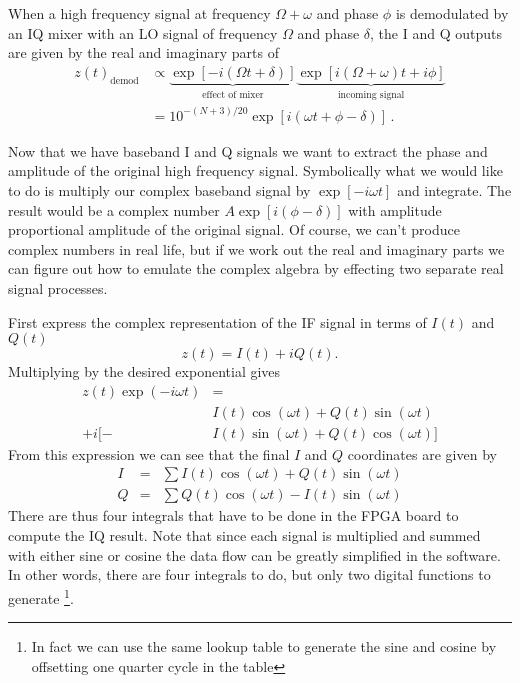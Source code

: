 
When a high frequency signal at frequency $\Omega+\omega$ and phase $\phi$ is demodulated by an IQ mixer with an LO signal of frequency $\Omega$ and phase $\delta$, the I and Q outputs are given by the real and imaginary parts of
\begin{align}
z(t)_{\textrm{demod}} &\propto \underbrace{\exp \left[-i \left( \Omega t + \delta \right) \right]}_{\textrm{effect of mixer}} \underbrace{\exp \left[ i\left( \Omega + \omega \right) t + i \phi \right]}_{\textrm{incoming signal}} \nonumber \\
&= 10^{-(N+3)/20} \exp \left[ i \left( \omega t + \phi-\delta \right) \right] \, . \nonumber
\end{align}


Now that we have baseband I and Q signals we want to extract the phase and amplitude of the original high frequency signal. Symbolically what we would like to do is multiply our complex baseband signal by $\exp \left[ -i \omega t \right]$ and integrate. The result would be a complex number $A \exp \left[ i \left( \phi - \delta \right) \right]$ with amplitude proportional amplitude of the original signal. Of course, we can't produce complex numbers in real life, but if we work out the real and imaginary parts we can figure out how to emulate the complex algebra by effecting two separate real signal processes.

First express the complex representation of the IF signal in terms of $I(t)$ and $Q(t)$ \begin{equation}
z(t) = I(t) + iQ(t). \end{equation}
Multiplying by the desired exponential gives \begin{align}
z(t) \exp \left(-i \omega t \right) &= \nonumber \\
        & I(t) \cos (\omega t) + Q(t) \sin (\omega t) \nonumber \\
+ i [ - & I(t) \sin (\omega t) + Q(t) \cos (\omega t) ] \end{align}
From this expression we can see that the final $I$ and $Q$ coordinates are given by \begin{eqnarray}
I &=& \sum I(t)\cos(\omega t) + Q(t) \sin(\omega t) \\
Q &=& \sum Q(t)\cos(\omega t) - I(t) \sin(\omega t) \end{eqnarray}
There are thus four integrals that have to be done in the FPGA board to compute the IQ result. Note that since each signal is multiplied and summed with either sine or cosine the data flow can be greatly simplified in the software. In other words, there are four integrals to do, but only two digital functions to generate \footnote{In fact we can use the same lookup table to generate the sine and cosine by offsetting one quarter cycle in the table}.

